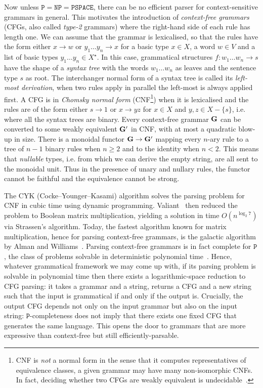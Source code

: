Now unless $\mathtt{P} = \mathtt{NP} = \mathtt{PSPACE}$, there can be no efficient parser for context-sensitive grammars in general.
This motivates the introduction of \emph{context-free grammars} (CFGs, also called \emph{type-2} grammars) where the right-hand side of each rule has length one.
We can assume that the grammar is lexicalised, so that the rules have the form either $x \to w$ or $y_1 \dots y_n \to x$ for a basic type $x \in X$, a word $w \in V$ and a list of basic types $y_1 \dots y_n \in X^\star$.
In this case, grammatical structures $f : w_1 \dots w_n \to s$ have the shape of a \emph{syntax tree} with the words $w_1 \dots w_n$ as leaves and the sentence type $s$ as root.
The interchanger normal form of a syntax tree is called its \emph{left-most derivation}, when two rules apply in parallel the left-most is always applied first.
A CFG is in \emph{Chomsky normal form} (CNF\footnote
{CNF is \emph{not} a normal form in the sense that it computes representatives of equivalence classes, a given grammar may have many non-isomorphic CNFs.
In fact, deciding whether two CFGs are weakly equivalent is undecidable~\cite[Theorem~26]{Chomsky63}.}) when it is lexicalised and the rules are of the form either $s \to 1$ or $x \to y z$ for $x \in X$ and $y, z \in X - \{ s \}$, i.e. where all the syntax trees are binary.
Every context-free grammar $\mathbf{G}$ can be converted to some weakly equivalent $\mathbf{G}'$ in CNF, with at most a quadratic blow-up in size.
There is a monoidal functor $\mathbf{G} \to \mathbf{G}'$ mapping every $n$-ary rule to a tree of $n - 1$ binary rules when $n \geq 2$ and to the identity when $n < 2$.
This means that \emph{nullable} types, i.e. from which we can derive the empty string, are all sent to the monoidal unit.
Thus in the presence of unary and nullary rules, the functor cannot be faithful and the equivalence cannot be strong.

The CYK (Cocke–Younger–Kasami) algorithm solves the parsing problem for CNF in cubic time using dynamic programming.
Valiant~\cite{Valiant75} then reduced the problem to Boolean matrix multiplication, yielding a solution in time $O(n^{\log_2 7})$ via Strassen's algorithm.
Today, the fastest algorithm known for matrix multiplication, hence for parsing context-free grammars, is the galactic algorithm by Alman and Williams~\cite{AlmanWilliams21}.
Parsing context-free grammars is in fact complete for $\mathtt{P}$, the class of problems solvable in deterministic polynomial time~\cite{JonesLaaser74}.
Hence, whatever grammatical framework we may come up with, if its parsing problem is solvable in polynomial time then there exists a logarithmic-space reduction to CFG parsing: it takes a grammar and a string, returns a CFG and a new string such that the input is grammatical if and only if the output is.
Crucially, the output CFG depends not only on the input grammar but also on the input string: $\mathtt{P}$-completeness does not imply that there exists one fixed CFG that generates the same language.
This opens the door to grammars that are more expressive than context-free but still efficiently-parsable.

